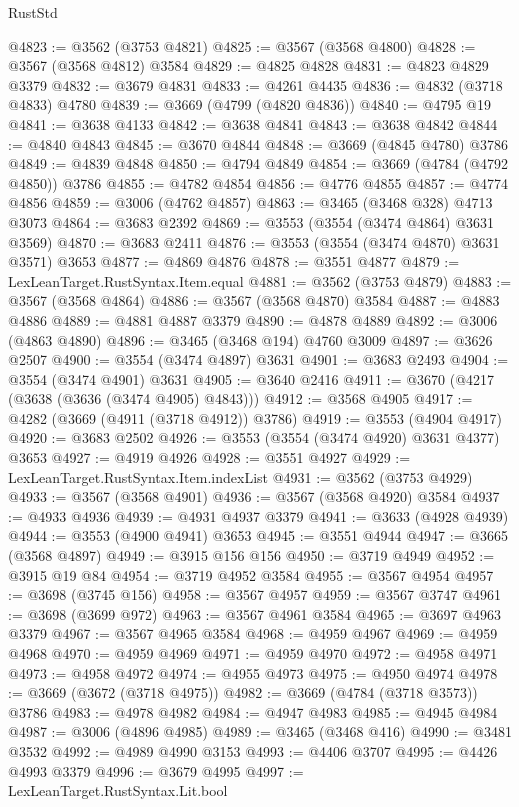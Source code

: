 \begin{lexlean}{RustStd}
\begin{coremodule}
@4823 := @3562 (@3753 @4821)
@4825 := @3567 (@3568 @4800)
@4828 := @3567 (@3568 @4812) @3584
@4829 := @4825 @4828
@4831 := @4823 @4829 @3379
@4832 := @3679 @4831
@4833 := @4261 @4435
@4836 := @4832 (@3718 @4833) @4780
@4839 := @3669 (@4799 (@4820 @4836))
@4840 := @4795 @19
@4841 := @3638 @4133
@4842 := @3638 @4841
@4843 := @3638 @4842
@4844 := @4840 @4843
@4845 := @3670 @4844
@4848 := @3669 (@4845 @4780) @3786
@4849 := @4839 @4848
@4850 := @4794 @4849
@4854 := @3669 (@4784 (@4792 @4850)) @3786
@4855 := @4782 @4854
@4856 := @4776 @4855
@4857 := @4774 @4856
@4859 := @3006 (@4762 @4857)
@4863 := @3465 (@3468 @328) @4713 @3073
@4864 := @3683 @2392
@4869 := @3553 (@3554 (@3474 @4864) @3631 @3569)
@4870 := @3683 @2411
@4876 := @3553 (@3554 (@3474 @4870) @3631 @3571) @3653
@4877 := @4869 @4876
@4878 := @3551 @4877
@4879 := LexLeanTarget.RustSyntax.Item.equal
@4881 := @3562 (@3753 @4879)
@4883 := @3567 (@3568 @4864)
@4886 := @3567 (@3568 @4870) @3584
@4887 := @4883 @4886
@4889 := @4881 @4887 @3379
@4890 := @4878 @4889
@4892 := @3006 (@4863 @4890)
@4896 := @3465 (@3468 @194) @4760 @3009
@4897 := @3626 @2507
@4900 := @3554 (@3474 @4897) @3631
@4901 := @3683 @2493
@4904 := @3554 (@3474 @4901) @3631
@4905 := @3640 @2416
@4911 := @3670 (@4217 (@3638 (@3636 (@3474 @4905) @4843)))
@4912 := @3568 @4905
@4917 := @4282 (@3669 (@4911 (@3718 @4912)) @3786)
@4919 := @3553 (@4904 @4917)
@4920 := @3683 @2502
@4926 := @3553 (@3554 (@3474 @4920) @3631 @4377) @3653
@4927 := @4919 @4926
@4928 := @3551 @4927
@4929 := LexLeanTarget.RustSyntax.Item.indexList
@4931 := @3562 (@3753 @4929)
@4933 := @3567 (@3568 @4901)
@4936 := @3567 (@3568 @4920) @3584
@4937 := @4933 @4936
@4939 := @4931 @4937 @3379
@4941 := @3633 (@4928 @4939)
@4944 := @3553 (@4900 @4941) @3653
@4945 := @3551 @4944
@4947 := @3665 (@3568 @4897)
@4949 := @3915 @156 @156
@4950 := @3719 @4949
@4952 := @3915 @19 @84
@4954 := @3719 @4952 @3584
@4955 := @3567 @4954
@4957 := @3698 (@3745 @156)
@4958 := @3567 @4957
@4959 := @3567 @3747
@4961 := @3698 (@3699 @972)
@4963 := @3567 @4961 @3584
@4965 := @3697 @4963 @3379
@4967 := @3567 @4965 @3584
@4968 := @4959 @4967
@4969 := @4959 @4968
@4970 := @4959 @4969
@4971 := @4959 @4970
@4972 := @4958 @4971
@4973 := @4958 @4972
@4974 := @4955 @4973
@4975 := @4950 @4974
@4978 := @3669 (@3672 (@3718 @4975))
@4982 := @3669 (@4784 (@3718 @3573)) @3786
@4983 := @4978 @4982
@4984 := @4947 @4983
@4985 := @4945 @4984
@4987 := @3006 (@4896 @4985)
@4989 := @3465 (@3468 @416)
@4990 := @3481 @3532
@4992 := @4989 @4990 @3153
@4993 := @4406 @3707
@4995 := @4426 @4993 @3379
@4996 := @3679 @4995
@4997 := LexLeanTarget.RustSyntax.Lit.bool

\end{coremodule}
\end{lexlean}
